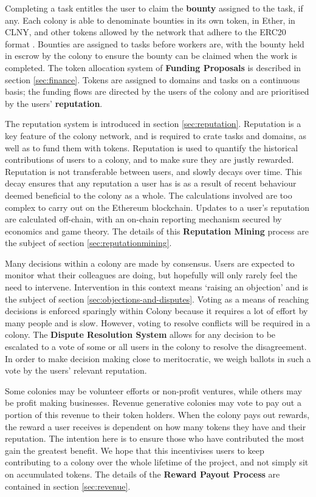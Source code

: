 Completing a task entitles the user to claim the \textbf{bounty} assigned to the task, if any. Each colony is able to denominate bounties in its own token, in Ether, in CLNY, and other tokens allowed by the network that adhere to the ERC20 format \cite{erc20}. Bounties are assigned to tasks before workers are, with the bounty held in escrow by the colony to ensure the bounty can be claimed when the work is completed. The token allocation system of \textbf{Funding Proposals} is described in section \ref{sec:finance}. Tokens are assigned to domains and tasks on a continuous basis; the funding flows are directed by the users of the colony and are prioritised by the users' \textbf{reputation}. 

The reputation system is introduced in section \ref{sec:reputation}. Reputation is a key feature of the colony network, and is required to crate tasks and domains, as well as to fund them with tokens. Reputation is used to quantify the historical contributions of users to a colony, and to make sure they are justly rewarded. Reputation is not transferable between users, and slowly decays over time. This decay ensures that any reputation a user has is as a result of recent behaviour deemed beneficial to the colony as a whole. The calculations involved are too complex to carry out on the Ethereum blockchain. Updates to a user's reputation are calculated off-chain, with an on-chain reporting mechanism secured by economics and game theory. The details of this \textbf{Reputation Mining} process are the subject of section \ref{sec:reputationmining}.

Many decisions within a colony are made by consensus. Users are expected to monitor what their colleagues are doing, but hopefully will only rarely feel the need to intervene. Intervention in this context means `raising an objection' and is the subject of section \ref{sec:objections-and-disputes}. Voting as a means of reaching decisions is enforced sparingly within Colony because it requires a lot of effort by many people and is slow. However, voting to resolve conflicts will be required in a colony. The \textbf{Dispute Resolution System} allows for any decision to be escalated to a vote of some or all users in the colony to resolve the disagreement. In order to make decision making close to meritocratic, we weigh ballots in such a vote by the users' relevant reputation.

Some colonies may be volunteer efforts or non-profit ventures, while others may be profit making businesses. Revenue generative colonies may vote to pay out a portion of this revenue to their token holders. When the colony pays out rewards, the reward a user receives is dependent on how many tokens they have and their reputation. The intention here is to ensure those who have contributed the most gain the greatest benefit. We hope that this incentivises users to keep contributing to a colony over the whole lifetime of the project, and not simply sit on accumulated tokens. The details of the \textbf{Reward Payout Process} are contained in section \ref{sec:revenue}.

